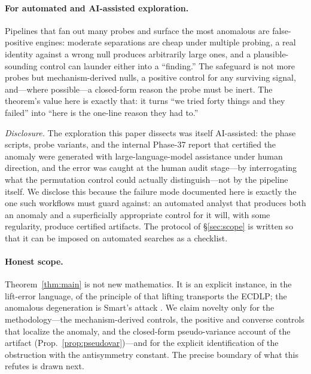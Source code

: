 \documentclass[11pt]{article}
\theoremstyle{definition}
\begin{document}
\paragraph{For automated and AI-assisted exploration.} Pipelines that fan
out many probes and surface the most anomalous are false-positive
engines: moderate separations are cheap under multiple probing, a real
identity against a wrong null produces arbitrarily large ones, and a
plausible-sounding control can launder either into a ``finding.'' The
safeguard is not more probes but mechanism-derived nulls, a positive
control for any surviving signal, and---where possible---a closed-form
reason the probe must be inert. The theorem's value here is exactly
that: it turns ``we tried forty things and they failed'' into ``here is
the one-line reason they had to.''

\emph{Disclosure.} The exploration this paper dissects was itself
AI-assisted: the phase scripts, probe variants, and the internal
Phase-37 report that certified the anomaly were generated with
large-language-model assistance under human direction, and the error was
caught at the human audit stage---by interrogating what the permutation
control could actually distinguish---not by the pipeline itself. We
disclose this because the failure mode documented here is exactly the
one such workflows must guard against: an automated analyst that
produces both an anomaly and a superficially appropriate control for it
will, with some regularity, produce certified artifacts. The protocol of
\S\ref{sec:scope} is written so that it can be imposed on automated
searches as a checklist.

\paragraph{Honest scope.} Theorem~\ref{thm:main} is not new mathematics.
It is an explicit instance, in the lift-error language, of the principle
of \cite{silvermanlift,silverman4faces,gadiyarpadma} that lifting
transports the ECDLP; the anomalous degeneration is Smart's attack
\cite{smart}. We claim novelty only for the methodology---the
mechanism-derived controls, the positive and converse controls that
localize the anomaly, and the closed-form pseudo-variance account of the
artifact (Prop.~\ref{prop:pseudovar})---and for the explicit
identification of the obstruction with the antisymmetry constant. The
precise boundary of what this refutes is drawn next.
\end{document}
